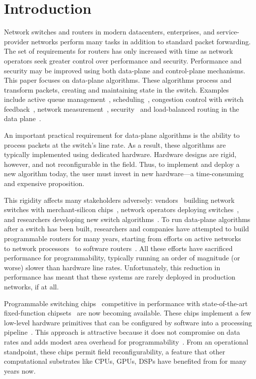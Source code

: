 \section{Introduction}
\label{s:intro}

Network switches and routers in modern datacenters, enterprises, and
service-provider networks perform many tasks in addition to standard packet
forwarding. The set of requirements for routers has only increased with time as
network operators seek greater control over performance and security.
Performance and security may be improved using both data-plane and
control-plane mechanisms. This paper focuses on data-plane algorithms. These
algorithms process and transform packets, creating and maintaining state in the
switch. Examples include active queue management~\cite{red,blue,avq,codel,pie},
scheduling~\cite{pifo_hotnets}, congestion control with switch
feedback~\cite{xcp, rcp, pdq, dctcp}, network measurement~\cite{opensketch,
bitmap_george, elephant_george}, security~\cite{dns_change} and load-balanced
routing in the data plane~\cite{conga}.

An important practical requirement for data-plane algorithms is the
ability to process packets at the switch's line rate.  As a result,
these algorithms are typically implemented using dedicated
hardware. Hardware designs are rigid, however, and not reconfigurable
in the field. Thus, to implement and deploy a new algorithm today, the
user must invest in new hardware---a time-consuming and expensive
proposition.

This rigidity affects many stakeholders adversely:
vendors~\cite{cisco_nexus, dell_force10, arista_7050} building network
switches with merchant-silicon chips~\cite{trident, tomahawk,
  mellanox}, network operators deploying
switches~\cite{google,facebook,vl2}, and researchers developing new
switch algorithms~\cite{xcp, codel, d3, detail, pdq}.  To run
data-plane algorithms after a switch has been built, researchers and
companies have attempted to build programmable routers for many years,
starting from efforts on active networks~\cite{active-nets} to network
processors~\cite{npu_survey} to software
routers~\cite{click, dpdk, routebricks}. All these efforts have sacrificed
performance for programmability, typically running an order of
magnitude (or worse) slower than hardware line rates. Unfortunately,
this reduction in performance has meant that these systems are rarely
deployed in production networks, if at all.

Programmable switching chips~\cite{flexpipe, xpliant, rmt, corsa,
  uadp, algo_logic} competitive in performance with state-of-the-art
fixed-function chipsets~\cite{trident, tomahawk, mellanox} are now
becoming available. These chips implement a few low-level hardware
primitives that can be configured by software into a processing
pipeline~\cite{xpliant_sdk,xpliant_sdk2,intel_sdk}.  This approach is
attractive because it does not compromise on data rates and adds
modest area overhead for programmability~\cite{rmt}. From an
operational standpoint, these chips permit field reconfigurability, a
feature that other computational substrates like CPUs, GPUs,
DSPs have benefited from for many years now.

